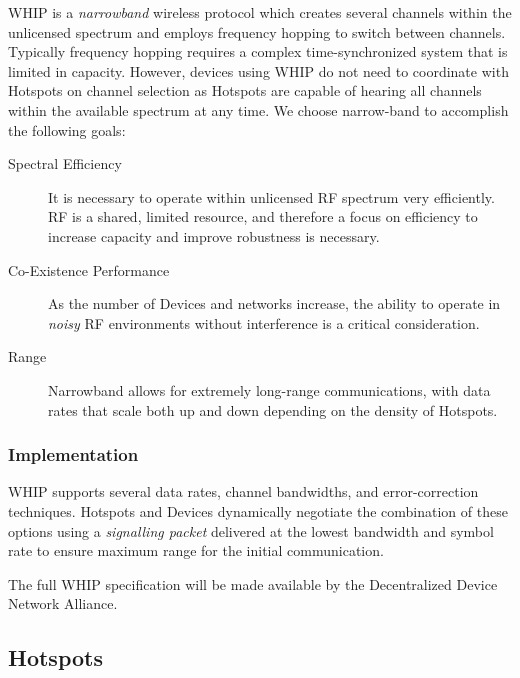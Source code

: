 \documentclass[10pt, nonatbib, nocopyrightspace, reprint]{sigplanconf}
\begin{document}
WHIP is a \emph{narrowband} wireless protocol which creates several channels within the unlicensed spectrum and employs frequency hopping to switch between channels. Typically frequency hopping requires a complex time-synchronized system that is limited in capacity. However, devices using WHIP do not need to coordinate with Hotspots on channel selection as Hotspots are capable of hearing all channels within the available spectrum at any time. We choose narrow-band to accomplish the following goals:

\begin{description}

\item [Spectral Efficiency] It is necessary to operate within unlicensed RF spectrum very efficiently. RF is a shared, limited resource, and therefore a focus on efficiency to increase capacity and improve robustness is necessary.

\item [Co-Existence Performance] As the number of Devices and networks increase, the ability to operate in \emph{noisy} RF environments without interference is a critical consideration.

\item [Range] Narrowband allows for extremely long-range communications, with data rates that scale both up and down depending on the density of Hotspots.

\end{description}

\subsubsection{Implementation}

WHIP supports several data rates, channel bandwidths, and error-correction techniques. Hotspots and Devices dynamically negotiate the combination of these options using a \emph{signalling packet} delivered at the lowest bandwidth and symbol rate to ensure maximum range for the initial communication.

The full WHIP specification will be made available by the Decentralized Device Network Alliance.

\subsection{Hotspots}\label{hotspots}
\end{document}
